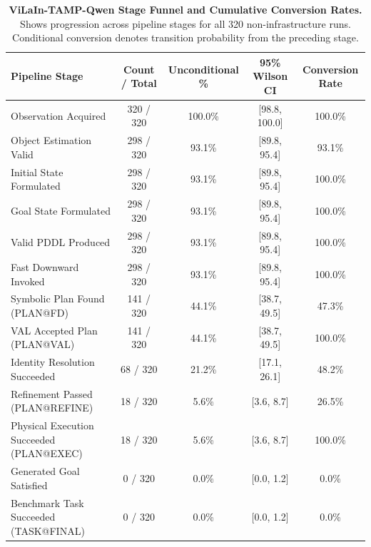 \begin{table}[t]
\centering
\small
\caption{\textbf{ViLaIn-TAMP-Qwen Stage Funnel and Cumulative Conversion Rates.}
Shows progression across pipeline stages for all 320 non-infrastructure runs.
Conditional conversion denotes transition probability from the preceding stage.}
\label{tab:vilain_qwen_funnel}
\begin{tabular}{l|c|c|c|c}
\hline
\textbf{Pipeline Stage} & \textbf{Count / Total} & \textbf{Unconditional \%} & \textbf{95\% Wilson CI} & \textbf{Conversion Rate} \\
\hline
Observation Acquired & 320 / 320 & 100.0\% & [98.8, 100.0] & 100.0\% \\
Object Estimation Valid & 298 / 320 & 93.1\% & [89.8, 95.4] & 93.1\% \\
Initial State Formulated & 298 / 320 & 93.1\% & [89.8, 95.4] & 100.0\% \\
Goal State Formulated & 298 / 320 & 93.1\% & [89.8, 95.4] & 100.0\% \\
Valid PDDL Produced & 298 / 320 & 93.1\% & [89.8, 95.4] & 100.0\% \\
Fast Downward Invoked & 298 / 320 & 93.1\% & [89.8, 95.4] & 100.0\% \\
Symbolic Plan Found (PLAN@FD) & 141 / 320 & 44.1\% & [38.7, 49.5] & 47.3\% \\
VAL Accepted Plan (PLAN@VAL) & 141 / 320 & 44.1\% & [38.7, 49.5] & 100.0\% \\
Identity Resolution Succeeded & 68 / 320 & 21.2\% & [17.1, 26.1] & 48.2\% \\
Refinement Passed (PLAN@REFINE) & 18 / 320 & 5.6\% & [3.6, 8.7] & 26.5\% \\
Physical Execution Succeeded (PLAN@EXEC) & 18 / 320 & 5.6\% & [3.6, 8.7] & 100.0\% \\
Generated Goal Satisfied & 0 / 320 & 0.0\% & [0.0, 1.2] & 0.0\% \\
Benchmark Task Succeeded (TASK@FINAL) & 0 / 320 & 0.0\% & [0.0, 1.2] & 0.0\% \\
\hline
\end{tabular}
\end{table}
